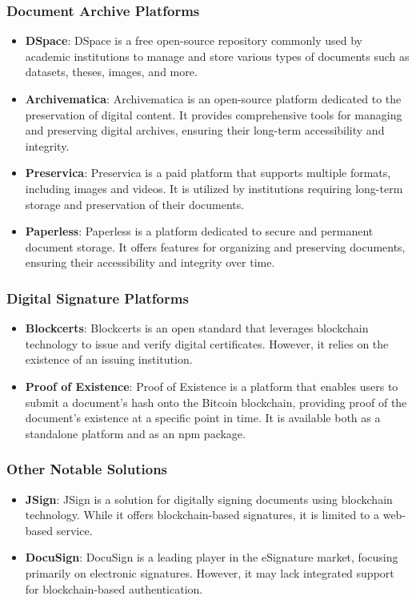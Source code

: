 \documentclass[a4paper,11pt]{article}
\begin{document}
    \subsubsection{Document Archive Platforms}
    \begin{itemize}
    \item \textbf{DSpace}: DSpace is a free open-source repository commonly used by academic institutions to manage and store various types of documents such as datasets, theses, images, and more.
    \item \textbf{Archivematica}: Archivematica is an open-source platform dedicated to the preservation of digital content. It provides comprehensive tools for managing and preserving digital archives, ensuring their long-term accessibility and integrity.
    \item \textbf{Preservica}: Preservica is a paid platform that supports multiple formats, including images and videos. It is utilized by institutions requiring long-term storage and preservation of their documents.
    \item \textbf{Paperless}: Paperless is a platform dedicated to secure and permanent document storage. It offers features for organizing and preserving documents, ensuring their accessibility and integrity over time.
    \end{itemize}
    
    \subsubsection{Digital Signature Platforms}
    \begin{itemize}
    \item \textbf{Blockcerts}: Blockcerts is an open standard that leverages blockchain technology to issue and verify digital certificates. However, it relies on the existence of an issuing institution.
    \item \textbf{Proof of Existence}: Proof of Existence is a platform that enables users to submit a document's hash onto the Bitcoin blockchain, providing proof of the document's existence at a specific point in time. It is available both as a standalone platform and as an npm package.
    \end{itemize}
    
    \subsubsection{Other Notable Solutions}
    \begin{itemize}
    \item \textbf{JSign}: JSign is a solution for digitally signing documents using blockchain technology. While it offers blockchain-based signatures, it is limited to a web-based service.
    \item \textbf{DocuSign}: DocuSign is a leading player in the eSignature market, focusing primarily on electronic signatures. However, it may lack integrated support for blockchain-based authentication.
    \end{itemize}
    
\end{document}
